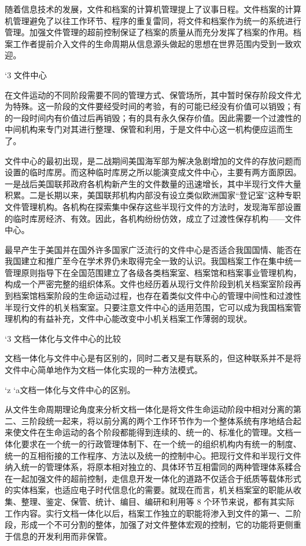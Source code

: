     随着信息技术的发展，文件和档案的计算机管理提上了议事日程。文件档案的计算机管理避免了以往工作环节、程序的重复雷同，将文件和档案作为统一的系统进行管理。加强文件管理的超前控制保证了档案的质量从而充分发挥了档案的作用。档案工作者提前介入文件的生命周期从信息源头做起的思想在世界范围内受到一致欢迎。

    `3 文件中心

    在文件运动的不同阶段需要不同的管理方式、保管场所，其中暂时保存阶段文件尤为特殊。这一阶段的文件要经受时间的考验，有的可能已经没有价值可以销毁；有的一段时间内有价值过后再销毁；有的具有永久保存价值。因此需要一个过渡性的中间机构来专门对其进行整理、保管和利用，于是文件中心这一机构便应运而生了。

    文件中心的最初出现，是二战期间美国海军部为解决急剧增加的文件的存放问题而设置的临时库房。而这种临时库房之所以能演变成文件中心，主要有两方面原因。一是战后美国联邦政府各机构新产生的文件数量的迅速增长，其中半现行文件大量积累。二是长期以来，美国联邦机构内部没有设立类似欧洲国家“登记室”这种专职文件管理机构。各机构在探索集中保存这些半现行文件的方法时，发现海军部设置的临时库房经济、有效。因此，各机构纷纷仿效，成立了过渡性保存机构——文件中心。

    最早产生于美国并在国外许多国家广泛流行的文件中心是否适合我国国情、能否在我国建立和推广至今在学术界仍未取得完全一致的认识。我国档案工作在集中统一管理原则指导下在全国范围建立了各级各类档案室、档案馆和档案事业管理机构，构成一个严密完整的组织体系。文件也经历着从现行文件阶段到机关档案室阶段再到档案馆档案阶段的生命运动过程，也存在着类似文件中心的管理中间性和过渡性半现行文件的机关档案室。只要注意文件中心的适用范围，它可以成为我国档案管理机构的有益补充，文件中心能改变中小机关档案工作薄弱的现状。

    `3 文档一体化与文件中心的比较

    文档一体化与文件中心是有区别的，同时二者又是有联系的，但这种联系并不是将文件中心简单地作为文档一体化实现的一种方法模式。

    `z
    `a文档一体化与文件中心的区别。

    从文件生命周期理论角度来分析文档一体化是将文件生命运动阶段中相对分离的第二、三阶段统一起来，将以前分离的两个工作环节作为一个整体系统有序地结合起来使文件在生命运动的各个阶段都能得到连续的、统一的、标准化的管理。文档一体化要求在一个统一的行政管理体制下、在一个统一的组织机构内有统一的制度、统一的互相衔接的工作程序、方法以及统一的控制中心。把现行文件和半现行文件纳入统一的管理体系，将原本相对独立的、具体环节互相雷同的两种管理体系糅合在一起加强文件的超前控制，走信息开发一体化的道路不仅适合于纸质等载体形式的实体档案，也适应电子时代信息化的需要。就现在而言，机关档案室的职能从收集、整理、鉴定、保管、统计、编目、编研和利用等 8 个环节来说，都有其实际工作内容。实行文档一体化以后，档案工作独立的职能将渗入到文件的第一、二阶段，形成一个不可分割的整体，加强了对文件整体宏观的控制，它的功能将更侧重于信息的开发利用而非保管。

